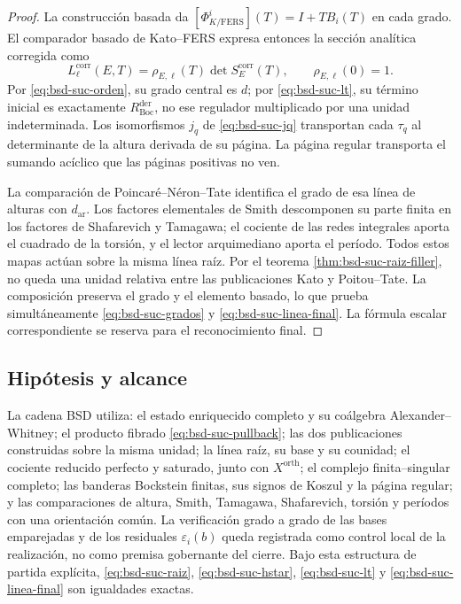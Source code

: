 \begin{proof}
La construcción basada da
\([\Phi_{K/\mathrm{FERS}}^i](T)=I+TB_i(T)\) en cada grado. El comparador
basado de Kato--FERS expresa entonces la sección analítica corregida
como
\begin{equation}\label{eq:bsd-suc-fers}
 L_{\ell}^{\mathrm{corr}}(E,T)
 =\rho_{E,\ell}(T)\det S_E^{\mathrm{corr}}(T),
 \qquad \rho_{E,\ell}(0)=1.
\end{equation}
Por \eqref{eq:bsd-suc-orden}, su grado central es \(d\); por
\eqref{eq:bsd-suc-lt}, su término inicial es exactamente
\(R_{\mathrm{Boc}}^{\mathrm{der}}\), no ese regulador multiplicado por una
unidad indeterminada. Los isomorfismos \(j_q\) de
\eqref{eq:bsd-suc-jq} transportan cada \(\tau_q\) al determinante de la
altura derivada de su página. La página regular transporta el sumando
acíclico que las páginas positivas no ven.

La comparación de Poincaré--Néron--Tate identifica el grado de esa línea de
alturas con \(d_{\mathrm{ar}}\). Los factores elementales de Smith descomponen su parte
finita en los factores de Shafarevich y Tamagawa; el cociente de las redes
integrales aporta el cuadrado de la torsión, y el lector arquimediano aporta
el período. Todos estos mapas actúan sobre la misma línea raíz. Por el
teorema \ref{thm:bsd-suc-raiz-filler}, no queda una unidad relativa entre
las publicaciones Kato y Poitou--Tate. La composición preserva el grado y
el elemento basado, lo que prueba simultáneamente
\eqref{eq:bsd-suc-grados} y \eqref{eq:bsd-suc-linea-final}. La fórmula
escalar correspondiente se reserva para el reconocimiento final.
\end{proof}

\subsection*{Hipótesis y alcance}

La cadena BSD utiliza: el estado enriquecido completo y su coálgebra
Alexander--Whitney; el producto fibrado \eqref{eq:bsd-suc-pullback}; las dos
publicaciones construidas sobre la misma unidad; la línea raíz, su base y su
counidad; el cociente reducido perfecto y saturado, junto con
\(X^{\mathrm{orth}}\); el complejo finita--singular completo; las banderas
Bockstein finitas, sus signos de Koszul y la página regular; y las
comparaciones de altura, Smith, Tamagawa, Shafarevich, torsión y períodos
con una orientación común. La verificación grado a grado de las bases
emparejadas y de los residuales \(\varepsilon_i(b)\) queda registrada como
control local de la realización, no como premisa gobernante del cierre.
Bajo esta estructura de partida explícita,
\eqref{eq:bsd-suc-raiz}, \eqref{eq:bsd-suc-hstar},
\eqref{eq:bsd-suc-lt} y \eqref{eq:bsd-suc-linea-final} son igualdades
exactas.

